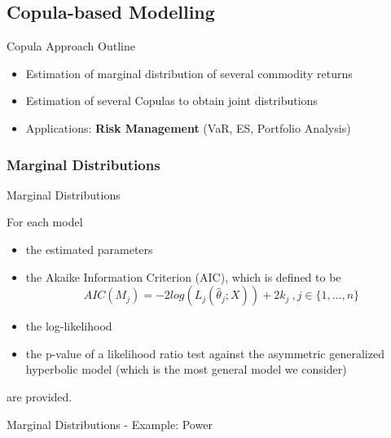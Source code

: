 \subsection{Copula-based Modelling}

{Copula Approach Outline} %
\begin{itemize}
\item Estimation of marginal  distribution of several commodity
returns \item Estimation of several Copulas to obtain joint
distributions \item Applications: \textbf{Risk Management} (VaR,
ES, Portfolio Analysis)
\end{itemize}



\subsubsection{Marginal Distributions}

{Marginal Distributions}

For each model
\begin{itemize}
\item the estimated parameters \item the Akaike Information
Criterion (AIC), which is defined to be
    \[AIC(M_j)=-2log(L_j(\hat{\theta}_j; X))+2k_j\ ,j\in\{1,\ldots,n\}\]
\item the log-likelihood \item the p-value of a likelihood ratio
test against the asymmetric generalized hyperbolic model (which is
the most general model we consider)
\end{itemize}
are provided.





{Marginal Distributions - Example: Power}


